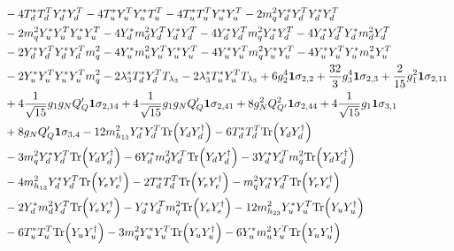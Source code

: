 {\begin{align}
 &-4 {T_d^*  T_{d}^{T}  Y_d^*  Y_{d}^{T}} -4 {T_u^*  Y_{u}^{T}  Y_u^*  T_{u}^{T}} -4 {T_u^*  T_{u}^{T}  Y_u^*  Y_{u}^{T}} -2 {m_q^2  Y_d^*  Y_{d}^{T}  Y_d^*  Y_{d}^{T}} \nonumber \\ 
 &-2 {m_q^2  Y_u^*  Y_{u}^{T}  Y_u^*  Y_{u}^{T}} -4 {Y_d^*  m_d^2  Y_{d}^{T}  Y_d^*  Y_{d}^{T}} -4 {Y_d^*  Y_{d}^{T}  m_q^2  Y_d^*  Y_{d}^{T}} -4 {Y_d^*  Y_{d}^{T}  Y_d^*  m_d^2  Y_{d}^{T}} \nonumber \\ 
 &-2 {Y_d^*  Y_{d}^{T}  Y_d^*  Y_{d}^{T}  m_q^2} -4 {Y_u^*  m_u^2  Y_{u}^{T}  Y_u^*  Y_{u}^{T}} -4 {Y_u^*  Y_{u}^{T}  m_q^2  Y_u^*  Y_{u}^{T}} -4 {Y_u^*  Y_{u}^{T}  Y_u^*  m_u^2  Y_{u}^{T}} \nonumber \\ 
 &-2 {Y_u^*  Y_{u}^{T}  Y_u^*  Y_{u}^{T}  m_q^2} -2 \lambda_3^* {T_d^*  Y_{d}^{T}} T_{\lambda_3} -2 \lambda_3^* {T_u^*  Y_{u}^{T}} T_{\lambda_3} +6 g_{2}^{4} {\bf 1} \sigma_{2,2} +\frac{32}{3} g_{3}^{4} {\bf 1} \sigma_{2,3} +\frac{2}{15} g_{1}^{2} {\bf 1} \sigma_{2,11} \nonumber \\ 
 &+4 \frac{1}{\sqrt{15}} g_1 g_N Q_Q' {\bf 1} \sigma_{2,14} +4 \frac{1}{\sqrt{15}} g_1 g_N Q_Q' {\bf 1} \sigma_{2,41} +8 g_{N}^{2} Q_{Q'}^{2} {\bf 1} \sigma_{2,44} +4 \frac{1}{\sqrt{15}} g_1 {\bf 1} \sigma_{3,1} \nonumber \\ 
 &+8 g_N Q_Q' {\bf 1} \sigma_{3,4} -12 m_{h_{13}}^2 {Y_d^*  Y_{d}^{T}} \mbox{Tr}\Big({Y_d  Y_{d}^{\dagger}}\Big) -6 {T_d^*  T_{d}^{T}} \mbox{Tr}\Big({Y_d  Y_{d}^{\dagger}}\Big) \nonumber \\ 
 &-3 {m_q^2  Y_d^*  Y_{d}^{T}} \mbox{Tr}\Big({Y_d  Y_{d}^{\dagger}}\Big) -6 {Y_d^*  m_d^2  Y_{d}^{T}} \mbox{Tr}\Big({Y_d  Y_{d}^{\dagger}}\Big) -3 {Y_d^*  Y_{d}^{T}  m_q^2} \mbox{Tr}\Big({Y_d  Y_{d}^{\dagger}}\Big) \nonumber \\ 
 &-4 m_{h_{13}}^2 {Y_d^*  Y_{d}^{T}} \mbox{Tr}\Big({Y_e  Y_{e}^{\dagger}}\Big) -2 {T_d^*  T_{d}^{T}} \mbox{Tr}\Big({Y_e  Y_{e}^{\dagger}}\Big) - {m_q^2  Y_d^*  Y_{d}^{T}} \mbox{Tr}\Big({Y_e  Y_{e}^{\dagger}}\Big) \nonumber \\ 
 &-2 {Y_d^*  m_d^2  Y_{d}^{T}} \mbox{Tr}\Big({Y_e  Y_{e}^{\dagger}}\Big) - {Y_d^*  Y_{d}^{T}  m_q^2} \mbox{Tr}\Big({Y_e  Y_{e}^{\dagger}}\Big) -12 m_{h_{23}}^2 {Y_u^*  Y_{u}^{T}} \mbox{Tr}\Big({Y_u  Y_{u}^{\dagger}}\Big) \nonumber \\ 
 &-6 {T_u^*  T_{u}^{T}} \mbox{Tr}\Big({Y_u  Y_{u}^{\dagger}}\Big) -3 {m_q^2  Y_u^*  Y_{u}^{T}} \mbox{Tr}\Big({Y_u  Y_{u}^{\dagger}}\Big) -6 {Y_u^*  m_u^2  Y_{u}^{T}} \mbox{Tr}\Big({Y_u  Y_{u}^{\dagger}}\Big) \nonumber \\ 

\end{align}}
